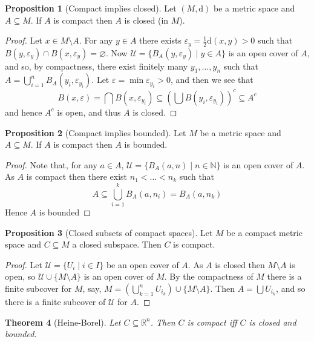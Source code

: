 \documentclass[10pt,fleqn]{article}
\newcommand{\met}{\mathrm{d}}
\newcommand{\reals}{\mathbb{R}}
\newcommand{\eps}{\varepsilon}
\theoremstyle{definition} \newtheorem{defn}{Definition}[section]
\theoremstyle{plain}      \newtheorem{thm}[defn]{Theorem}
\theoremstyle{definition} \newtheorem{prop}[defn]{Proposition}
\theoremstyle{definition} \newtheorem{cor}[defn]{Corollary}
\theoremstyle{definition} \newtheorem{ex}[defn]{Example}
\theoremstyle{definition} \newtheorem{rem}[defn]{Remark}
\begin{document}
\begin{prop}[Compact implies closed]
    Let $(M,\met)$ be a metric space and $A\subseteq M$.
    If $A$ is compact then $A$ is closed (in $M$).
\end{prop}

\begin{proof}
    Let $x\in M\setminus A$.
    For any $y\in A$ there exists $\eps_y=\frac{1}{2}\met(x,y)>0$ such that $B(y,\eps_y)\cap B(x,\eps_y)=\varnothing$.
    Now $\mathcal{U}=\{B_A(y,\eps_y)\mid y\in A\}$ is an open cover of $A$, and so, by compactness, there exist finitely many $y_1,\ldots,y_n$ such that $A=\bigcup_{i=1}^nB_A(y_i,\eps_{y_i})$.
    Let $\eps=\min\eps_{y_i}>0$, and then we see that
    \[
        B(x,\eps)=
        \bigcap B(x,\eps_{y_i})\subseteq
        \left(\bigcup B(y_i,\eps_{y_i})\right)^c\subseteq
        A^c
    \]
    and hence $A^c$ is open, and thus $A$ is closed.
\end{proof}

\begin{prop}[Compact implies bounded]
    Let $M$ be a metric space and $A\subseteq M$.
    If $A$ is compact then $A$ is bounded.
\end{prop}

\begin{proof}
    Note that, for any $a\in A$, $\mathcal{U}=\{B_A(a,n)\mid n\in\mathbb{N}\}$ is an open cover of $A$.
    As $A$ is compact then there exist $n_1<\ldots<n_k$ such that
    \[
        A\subseteq
        \bigcup_{i=1}^kB_A(a,n_i)=
        B_A(a,n_k)
    \]
    Hence $A$ is bounded
\end{proof}

\begin{prop}[Closed subsets of compact spaces]\label{closed-subsets-compact}
    Let $M$ be a compact metric space and $C\subseteq M$ a closed subspace.
    Then $C$ is compact.
\end{prop}

\begin{proof}
    Let $\mathcal{U}=\{U_i\mid i\in I\}$ be an open cover of $A$.
    As $A$ is closed then $M\setminus A$ is open, so $\mathcal{U}\cup\{M\setminus A\}$ is an open cover of $M$.
    By the compactness of $M$ there is a finite subcover for $M$, say, $M=\left(\bigcup_{k=1}^nU_{i_k}\right)\cup\{M\setminus A\}$.
    Then $A=\bigcup U_{i_k}$, and so there is a finite subcover of $\mathcal{U}$ for $A$.
\end{proof}

\begin{thm}[Heine-Borel]
    Let $C\subseteq\reals^n$.
    Then $C$ is compact iff $C$ is closed and bounded.
\end{thm}
\end{document}
